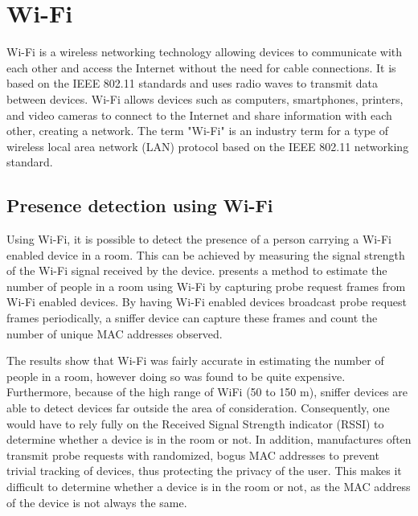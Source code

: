 \section{Wi-Fi} \label{sec:wi-fi}
Wi-Fi is a wireless networking technology allowing devices to communicate with each other and access the Internet without the need for cable connections.
It is based on the IEEE 802.11 standards and uses radio waves to transmit data between devices.
Wi-Fi allows devices such as computers, smartphones, printers, and video cameras to connect to the Internet and share information with each other, creating a network.
The term "Wi-Fi" is an industry term for a type of wireless local area network (LAN) protocol based on the IEEE 802.11 networking standard.\cite{WiFiAllianceDiscover,CiscoWhatIsWiFi}

\subsection{Presence detection using Wi-Fi}
Using Wi-Fi, it is possible to detect the presence of a person carrying a Wi-Fi enabled device in a room.
This can be achieved by measuring the signal strength of the Wi-Fi signal received by the device.
\citeauthor{longoAccurateOccupancyEstimation2019} presents a method to estimate the number of people in a room using Wi-Fi by capturing probe request frames from Wi-Fi enabled devices.
By having Wi-Fi enabled devices broadcast probe request frames periodically, a sniffer device can capture these frames and count the number of unique MAC addresses observed. \cite{longoAccurateOccupancyEstimation2019}

The results show that Wi-Fi was fairly accurate in estimating the number of people in a room, however doing so was found to be quite expensive.
Furthermore, because of the high range of WiFi (50 to 150 m), sniffer devices are able to detect devices far outside the area of consideration.
Consequently, one would have to rely fully on the Received Signal Strength indicator (RSSI) to determine whether a device is in the room or not.
In addition, manufactures often transmit probe requests with randomized, bogus MAC addresses to prevent trivial tracking of devices, thus protecting the privacy of the user.
This makes it difficult to determine whether a device is in the room or not, as the MAC address of the device is not always the same.\cite{longoAccurateOccupancyEstimation2019}